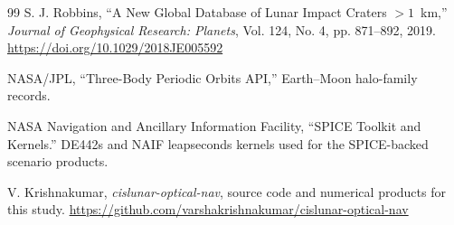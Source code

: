 \documentclass[10pt,twocolumn]{article}
\begin{document}
\begin{thebibliography}{99}
S. J. Robbins, ``A New Global Database of Lunar Impact Craters $>1$~km,'' \textit{Journal of Geophysical Research: Planets}, Vol. 124, No. 4, pp. 871--892, 2019. \url{https://doi.org/10.1029/2018JE005592}

NASA/JPL, ``Three-Body Periodic Orbits API,'' Earth--Moon halo-family records.

NASA Navigation and Ancillary Information Facility, ``SPICE Toolkit and Kernels.''  DE442s and NAIF leapseconds kernels used for the SPICE-backed scenario products.

V. Krishnakumar, \textit{cislunar-optical-nav}, source code and numerical products for this study. \url{https://github.com/varshakrishnakumar/cislunar-optical-nav}

\end{thebibliography}
\end{document}

